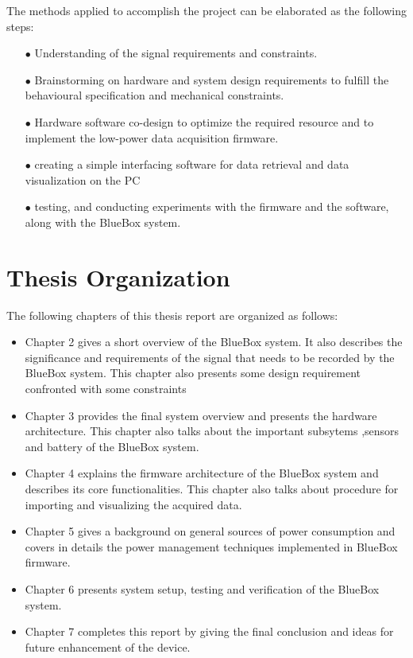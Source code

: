 The methods applied to accomplish the project can be elaborated as the following steps:
 \begin{itemize}
 	\item[$\bullet$] Understanding of the signal requirements and constraints. 
 	
 	\item[$\bullet$] Brainstorming on hardware and system design requirements to fulfill the behavioural specification and  mechanical constraints.
 	
 	\item[$\bullet$] Hardware software co-design to optimize the required resource and to implement the low-power data acquisition firmware.
 	
 	\item[$\bullet$] creating a simple interfacing software for data retrieval and data visualization on the PC
 	
 	\item[$\bullet$] testing, and conducting experiments with the firmware and the software,
 	along with the BlueBox system.
 \end{itemize}
 
\section{Thesis Organization}
The following chapters of this thesis report are organized as follows:
\begin{itemize}
	\item Chapter 2 gives a short overview of the BlueBox system. It also describes the significance and  requirements of the signal that needs to be recorded by the BlueBox system. This chapter also presents some design requirement confronted with some constraints
	
	\item Chapter 3 provides the final system overview and presents the hardware architecture. This chapter also talks about the important subsytems ,sensors and battery of the BlueBox system.
	
	\item  Chapter 4 explains the firmware architecture of the BlueBox system and describes its core functionalities. This chapter also talks about procedure for importing and visualizing the acquired data.
	
	\item Chapter 5 gives a background on general sources of power consumption and covers in details the power management techniques implemented in BlueBox firmware.
	
	\item Chapter 6 presents system setup, testing and verification of the BlueBox system. 
	
	\item
	Chapter 7 completes this report by giving the final conclusion and ideas for future enhancement of the device.
	
\end{itemize}
